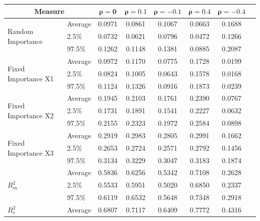 \begin{table}[H]
  \centering
  \begin{tabular}{@{}llcccccc@{}}
    \toprule
    \multicolumn{2}{c}{\textbf{Measure}} & $\mathbf{\rho=0}$ & $\mathbf{\rho=0.1}$ & $\mathbf{\rho=-0.1}$ & $\mathbf{\rho=0.4}$ & $\mathbf{\rho=-0.4}$ \\ \midrule
    \multirow{3}{*}{Random Importance} & Average & 0.0971 & 0.0861 & 0.1067 & 0.0663 & 0.1688 \\
                                       & 2.5\%   & 0.0732 & 0.0621 & 0.0796 & 0.0472 & 0.1266 \\
                                       & 97.5\%  & 0.1262 & 0.1148 & 0.1381 & 0.0885 & 0.2087 \\ \midrule
    \multirow{3}{*}{Fixed Importance X1} & Average & 0.0972 & 0.1170 & 0.0775 & 0.1728 & 0.0199 \\
                                         & 2.5\%   & 0.0824 & 0.1005 & 0.0643 & 0.1578 & 0.0168 \\
                                         & 97.5\%  & 0.1124 & 0.1326 & 0.0916 & 0.1873 & 0.0239 \\ \midrule
    \multirow{3}{*}{Fixed Importance X2} & Average & 0.1945 & 0.2103 & 0.1761 & 0.2390 & 0.0767 \\
                                         & 2.5\%   & 0.1731 & 0.1891 & 0.1541 & 0.2227 & 0.0632 \\
                                         & 97.5\%  & 0.2155 & 0.2323 & 0.1972 & 0.2584 & 0.0898 \\ \midrule
    \multirow{3}{*}{Fixed Importance X3} & Average & 0.2919 & 0.2983 & 0.2805 & 0.2991 & 0.1662 \\
                                         & 2.5\%   & 0.2653 & 0.2724 & 0.2571 & 0.2792 & 0.1456 \\
                                         & 97.5\%  & 0.3134 & 0.3229 & 0.3047 & 0.3183 & 0.1874 \\ \midrule
    \multirow{3}{*}{$R^2_m$}            & Average & 0.5836 & 0.6256 & 0.5342 & 0.7108 & 0.2628 \\
                                         & 2.5\%   & 0.5533 & 0.5951 & 0.5020 & 0.6850 & 0.2337 \\
                                         & 97.5\%  & 0.6119 & 0.6532 & 0.5648 & 0.7348 & 0.2918 \\ \midrule
    \multirow{3}{*}{$R^2_c$}            & Average & 0.6807 & 0.7117 & 0.6409 & 0.7772 & 0.4316 \\

\end{tabular}
\end{table}
